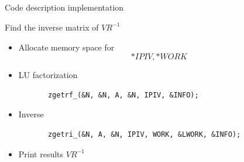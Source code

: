 \documentclass[xcolor=x11names,compress]{beamer}
\renewcommand{\(}{\begin{columns}}
\renewcommand{\)}{\end{columns}}
\newcommand{\<}[1]{\begin{column}{#1}}
\renewcommand{\>}{\end{column}}
\begin{document}
\subsection{}
\begin{frame}[fragile]{Code description implementation}
\begin{scriptsize}
 Find the inverse matrix of $VR^{-1}$
\begin{itemize}
  \item Allocate memory space for
   \[*IPIV,  *WORK \] 
  \item LU factorization 
  \begin{verbatim}
       zgetrf_(&N, &N, A, &N, IPIV, &INFO);
  \end{verbatim}
\item Inverse 
  \begin{verbatim}
       zgetri_(&N, A, &N, IPIV, WORK, &LWORK, &INFO);
  \end{verbatim}
   \item Print results $VR^{-1}$
\end{itemize}\end{scriptsize}
\end{frame}
\end{document}
